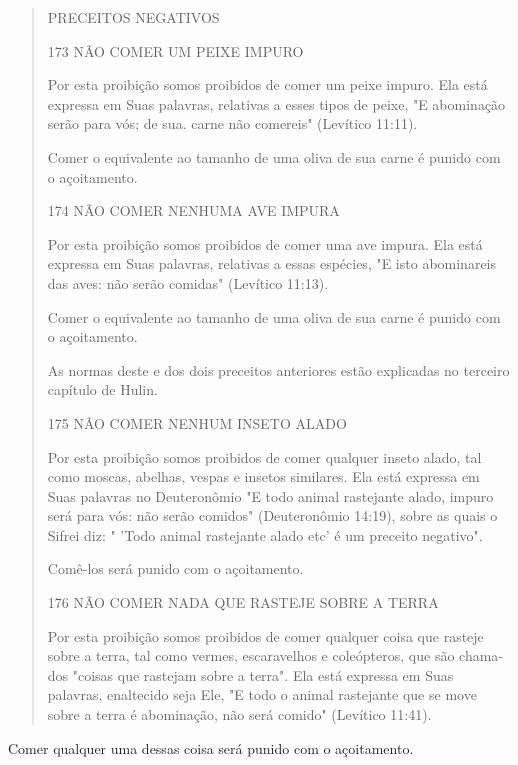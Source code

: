 \begin{quote}
PRECEITOS NEGATIVOS

173 NÃO COMER UM PEIXE IMPURO

Por esta proibição somos proibidos de comer um peixe impuro. Ela está
expressa em Suas palavras, relativas a esses tipos de peixe, "E
abominação serão para vós; de sua. carne não comereis" (Levítico 11:11).

Comer o equivalente ao tamanho de uma oliva de sua carne é puni­do com o
açoitamento.

174 NÃO COMER NENHUMA AVE IMPURA

Por esta proibição somos proibidos de comer uma ave impura. Ela está
expressa em Suas palavras, relativas a essas espécies, "E isto
abominareis das aves: não serão comidas" (Levítico 11:13).

Comer o equivalente ao tamanho de uma oliva de sua carne é puni­do com o
açoitamento.

As normas deste e dos dois preceitos anteriores estão explicadas no
terceiro capítulo de Hulin.

175 NÃO COMER NENHUM INSETO ALADO

Por esta proibição somos proibidos de comer qualquer inseto ala­do, tal
como moscas, abelhas, vespas e insetos similares. Ela está expressa em
Suas palavras no Deuteronômio "E todo animal rastejante alado, impuro
será para vós: não serão comidos" (Deuteronômio 14:19), sobre as quais o
Sifrei diz: " 'Todo animal rastejante alado etc' é um preceito
negativo".

Comê-los será punido com o açoitamento.

176 NÃO COMER NADA QUE RASTEJE SOBRE A TERRA

Por esta proibição somos proibidos de comer qualquer coisa que ras­teje
sobre a terra, tal como vermes, escaravelhos e coleópteros, que são
chama­dos "coisas que rastejam sobre a terra". Ela está expressa em Suas
palavras, enal­tecido seja Ele, "E todo o animal rastejante que se move
sobre a terra é abomi­nação, não será comido" (Levítico 11:41).
\end{quote}

Comer qualquer uma dessas coisa será punido com o açoitamento.

